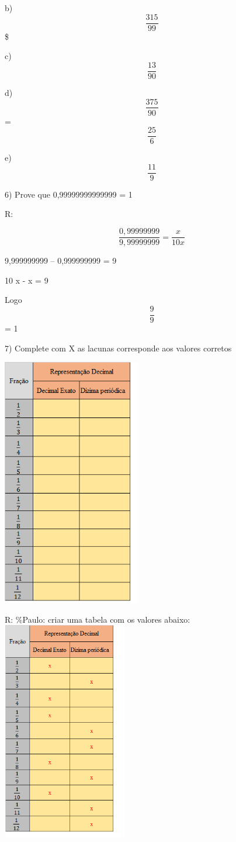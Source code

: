 b) \[\frac{315}{99}\]\$

c) \[\frac{13}{90}\]

d) \[\frac{375}{90}\] = \[\frac{25}{6}\]

e) \[\frac{11}{9}\]

6) Prove que 0,99999999999999 = 1

R:

\[\frac {0,99999999}{9,99999999} = \frac {x}{10x}\]

9,999999999 -- 0,999999999 = 9

10 x - x = 9

Logo \[\frac{9}{9}\] = 1

7) Complete com X as lacunas corresponde aos valores corretos

\includegraphics[width=2.37378in,height=4.29167in]{./imgSAEB_8_MAT/media/image3.png}

R: \%Paulo: criar uma tabela com os valores abaixo:
\includegraphics[width=2.14722in,height=3.775in]{./imgSAEB_8_MAT/media/image4.png}

